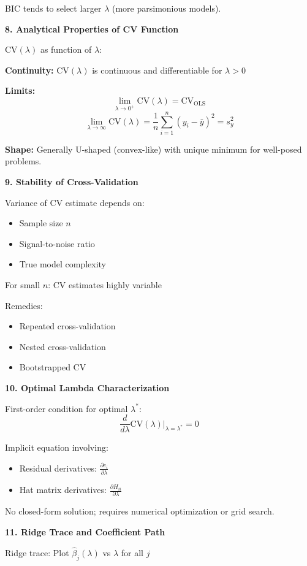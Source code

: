 \documentclass[12pt]{article}
\begin{document}
\begin{explanation}
BIC tends to select larger $\lambda$ (more parsimonious models).

\textbf{8. Analytical Properties of CV Function}

CV$(\lambda)$ as function of $\lambda$:

\textbf{Continuity:} CV$(\lambda)$ is continuous and differentiable for $\lambda > 0$

\textbf{Limits:}
\[\lim_{\lambda \to 0^+} \text{CV}(\lambda) = \text{CV}_{\text{OLS}}\]
\[\lim_{\lambda \to \infty} \text{CV}(\lambda) = \frac{1}{n}\sum_{i=1}^{n}(y_i - \bar{y})^2 = s_y^2\]

\textbf{Shape:} Generally U-shaped (convex-like) with unique minimum for well-posed problems.

\textbf{9. Stability of Cross-Validation}

Variance of CV estimate depends on:
\begin{itemize}
\item Sample size $n$
\item Signal-to-noise ratio
\item True model complexity
\end{itemize}

For small $n$: CV estimates highly variable

Remedies:
\begin{itemize}
\item Repeated cross-validation
\item Nested cross-validation
\item Bootstrapped CV
\end{itemize}

\textbf{10. Optimal Lambda Characterization}

First-order condition for optimal $\lambda^*$:
\[\frac{d}{d\lambda}\text{CV}(\lambda)\bigg|_{\lambda = \lambda^*} = 0\]

Implicit equation involving:
\begin{itemize}
\item Residual derivatives: $\frac{\partial e_i}{\partial \lambda}$
\item Hat matrix derivatives: $\frac{\partial H_{ii}}{\partial \lambda}$
\end{itemize}

No closed-form solution; requires numerical optimization or grid search.

\textbf{11. Ridge Trace and Coefficient Path}

Ridge trace: Plot $\hat{\beta}_j(\lambda)$ vs $\lambda$ for all $j$


\end{explanation}
\end{document}
